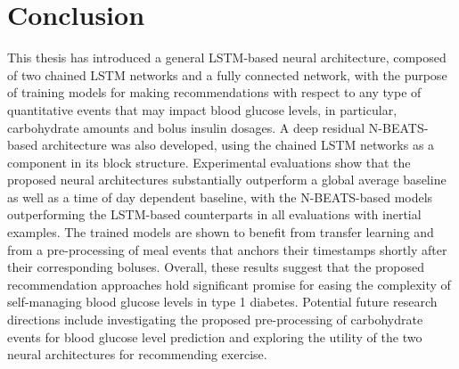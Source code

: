 \chapter{Conclusion}
\label{chapter:conclusion}

This thesis has introduced a general \ac{LSTM}-based neural architecture, composed of two chained \ac{LSTM} networks and a fully connected network, with the purpose of training  models for making recommendations with respect to any type of quantitative events that may impact blood glucose levels, in particular, carbohydrate amounts and bolus insulin dosages. A deep residual \ac{N-BEATS}-based architecture was also developed, using the chained \ac{LSTM} networks as a component in its block structure. Experimental evaluations show that the proposed neural architectures substantially outperform a global average baseline as well as a time of day dependent baseline, with the \ac{N-BEATS}-based models outperforming the \ac{LSTM}-based counterparts in all evaluations with inertial examples. The trained models are shown to benefit from transfer learning and from a pre-processing of meal events that anchors their timestamps shortly after their corresponding boluses. Overall, these results suggest that the proposed recommendation approaches hold significant promise for easing the complexity of self-managing blood glucose levels in type 1 diabetes. Potential future research directions include investigating the proposed pre-processing of carbohydrate events for blood glucose level prediction and exploring the utility of the two neural architectures for recommending exercise.